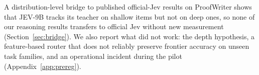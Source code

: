 A distribution-level bridge to published official-Jev results on ProofWriter shows that JEV-9B tracks its teacher on shallow items but not on deep ones, so none of our reasoning results transfers to official Jev without new measurement (Section~\ref{sec:bridge}).
We also report what did not work: the depth hypothesis, a feature-based router that does not reliably preserve frontier accuracy on unseen task families, and an operational incident during the pilot (Appendix~\ref{app:prereg}).
